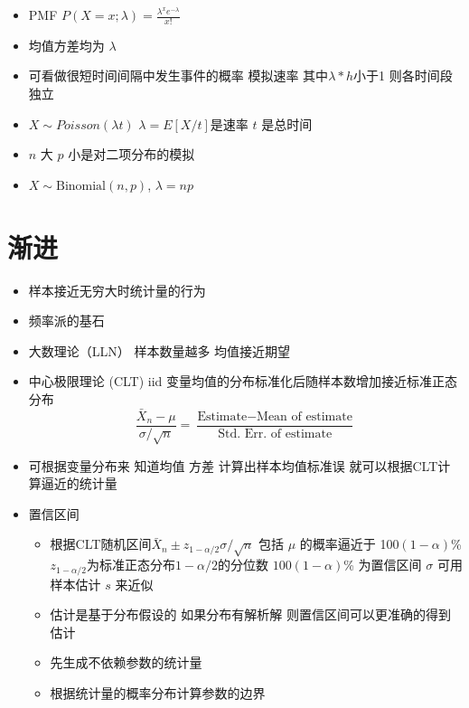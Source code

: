\documentclass[
]{book}
\providecommand{\tightlist}{%
  \setlength{\itemsep}{0pt}\setlength{\parskip}{0pt}}
\begin{document}
\begin{itemize}
  \begin{itemize}
  \tightlist
  \item
    PMF \(P(X = x; \lambda) = \frac{\lambda^x e^{-\lambda}}{x!}\)
  \item
    均值方差均为 \(\lambda\)
  \item
    可看做很短时间间隔中发生事件的概率 模拟速率 其中\(\lambda * h\)小于1 则各时间段独立
  \item
    \(X \sim Poisson(\lambda t)\) \(\lambda = E[X / t]\)是速率 \(t\) 是总时间
  \item
    \(n\) 大 \(p\) 小是对二项分布的模拟
  \item
    \(X \sim \mbox{Binomial}(n, p)\), \(\lambda = n p\)
  \end{itemize}
\end{itemize}

\hypertarget{ux6e10ux8fdb}{%
\section{渐进}\label{ux6e10ux8fdb}}

\begin{itemize}
\tightlist
\item
  样本接近无穷大时统计量的行为
\item
  频率派的基石
\item
  大数理论（LLN） 样本数量越多 均值接近期望
\item
  中心极限理论 (CLT) iid 变量均值的分布标准化后随样本数增加接近标准正态分布
  \[
  \frac{\bar X_n - \mu}{\sigma / \sqrt{n}} = 
    \frac{\mbox{Estimate} - \mbox{Mean of estimate}}{\mbox{Std. Err. of estimate}}
  \]
\item
  可根据变量分布来 知道均值 方差 计算出样本均值标准误 就可以根据CLT计算逼近的统计量
\item
  置信区间

  \begin{itemize}
  \tightlist
  \item
    根据CLT随机区间\(\bar X_n \pm z_{1-\alpha/2}\sigma / \sqrt{n}\) 包括 \(\mu\) 的概率逼近于 100\((1-\alpha)\)\% \(z_{1-\alpha/2}\)为标准正态分布\(1-\alpha/2\)的分位数 \(100(1 - \alpha)\)\% 为置信区间 \(\sigma\) 可用样本估计 \(s\) 来近似
  \item
    估计是基于分布假设的 如果分布有解析解 则置信区间可以更准确的得到估计
  \item
    先生成不依赖参数的统计量
  \item
    根据统计量的概率分布计算参数的边界
  \end{itemize}
\end{itemize}
\end{document}
